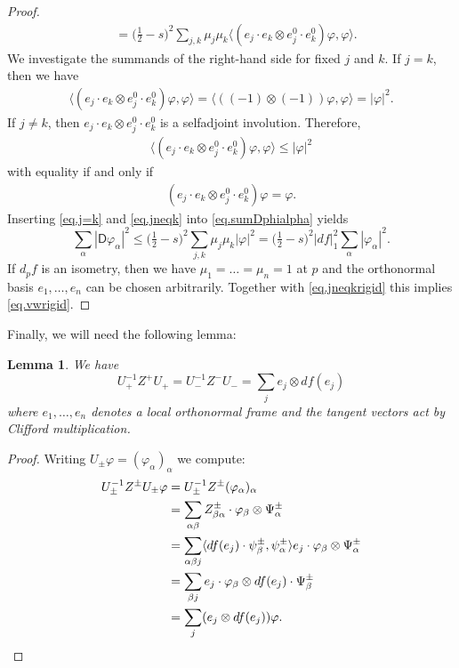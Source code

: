 \documentclass[11pt,reqno]{amsart}
\newcommand{\D}{\mathsf{D}}
\renewcommand{\phi}{\varphi}
\newcommand{\<}{\langle}
\renewcommand{\>}{\rangle}
\newtheorem{lemma}{Lemma}
\theoremstyle{definition}
\begin{document}
\begin{proof}
\begin{align}
&=
\big(\tfrac12-s\big)^2\sum_{j,k}\mu_j\mu_k \big\<(e_j\cdot e_k\otimes e^0_j\cdot e^0_k)\phi,\phi\big\> .
\label{eq.sumDphialpha}
\end{align}
We investigate the summands of the right-hand side for fixed $j$ and $k$.
If $j=k$, then we have
\begin{align}
\big\<(e_j\cdot e_k\otimes e^0_j\cdot e^0_k)\phi,\phi\big\>
=
\big\<((-1)\otimes (-1))\phi,\phi\big\>
=
|\phi|^2.
\label{eq.j=k}
\end{align}
If $j\neq k$, then $e_j\cdot e_k\otimes e^0_j\cdot e^0_k$ is a selfadjoint involution.
Therefore,
\begin{align}
\big\<(e_j\cdot e_k\otimes e^0_j\cdot e^0_k)\phi,\phi\big\>
\le|\phi|^2
\label{eq.jneqk}
\end{align}
with equality if and only if 
\begin{align}
(e_j\cdot e_k\otimes e^0_j\cdot e^0_k)\phi=\phi .
\label{eq.jneqkrigid}
\end{align}
Inserting \eqref{eq.j=k} and \eqref{eq.jneqk} into \eqref{eq.sumDphialpha} yields
\[
\sum_\alpha |\D \phi_\alpha|^2
\le
\big(\tfrac12-s\big)^2\sum_{j,k}\mu_j\mu_k  |\phi|^2
=
\big(\tfrac12-s\big)^2 |df|_1^2 \sum_\alpha |\phi_\alpha|^2 .
\]
If $d_pf$ is an isometry, then we have $\mu_1=\dots=\mu_n=1$ at $p$ and the orthonormal basis $e_1,\dots,e_n$ can be chosen arbitrarily.
Together with \eqref{eq.jneqkrigid} this implies \eqref{eq.vwrigid}.
\end{proof}

Finally, we will need the following lemma:

\begin{lemma}\label{lem.Z+-}
We have 
$$
U_+^{-1}Z^+U_+ = U_-^{-1}Z^- U_- = \sum_j e_j \otimes df(e_j)
$$
where $e_1,\dots,e_n$ denotes a local orthonormal frame and the tangent vectors act by Clifford multiplication.
\end{lemma}

\begin{proof}
Writing $U_\pm\phi = (\phi_\alpha)_\alpha$ we compute:
\begin{align*}
U_\pm^{-1} Z^\pm U_\pm \phi
&=
U_\pm^{-1} Z^\pm (\phi_\alpha)_\alpha \\
&=
\sum_{\alpha\beta} Z_{\beta\alpha}^\pm \cdot\phi_\beta \otimes \Psi_\alpha^\pm\\
&=
\sum_{\alpha\beta j} \<df(e_j)\cdot\psi_\beta^\pm,\psi_\alpha^\pm\>e_j \cdot\phi_\beta \otimes \Psi_\alpha^\pm\\
&=
\sum_{\beta j} e_j \cdot\phi_\beta \otimes df(e_j)\cdot\Psi_\beta^\pm\\
&=
\sum_{j} (e_j \otimes df(e_j))\phi .
\qedhere
\end{align*}
\end{proof}
\end{document}
